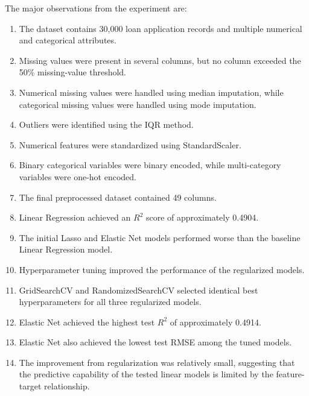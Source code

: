 \documentclass[12pt,a4paper]{article}
\begin{document}
The major observations from the experiment are:

\begin{enumerate}
    \item The dataset contains 30,000 loan application records and
    multiple numerical and categorical attributes.
    
    \item Missing values were present in several columns, but no column
    exceeded the 50\% missing-value threshold.
    
    \item Numerical missing values were handled using median imputation,
    while categorical missing values were handled using mode imputation.
    
    \item Outliers were identified using the IQR method.
    
    \item Numerical features were standardized using StandardScaler.
    
    \item Binary categorical variables were binary encoded, while
    multi-category variables were one-hot encoded.
    
    \item The final preprocessed dataset contained 49 columns.
    
    \item Linear Regression achieved an $R^2$ score of approximately
    0.4904.
    
    \item The initial Lasso and Elastic Net models performed worse than
    the baseline Linear Regression model.
    
    \item Hyperparameter tuning improved the performance of the
    regularized models.
    
    \item GridSearchCV and RandomizedSearchCV selected identical best
    hyperparameters for all three regularized models.
    
    \item Elastic Net achieved the highest test $R^2$ of approximately
    0.4914.
    
    \item Elastic Net also achieved the lowest test RMSE among the tuned
    models.
    
    \item The improvement from regularization was relatively small,
    suggesting that the predictive capability of the tested linear
    models is limited by the feature-target relationship.
\end{enumerate}
\end{document}
